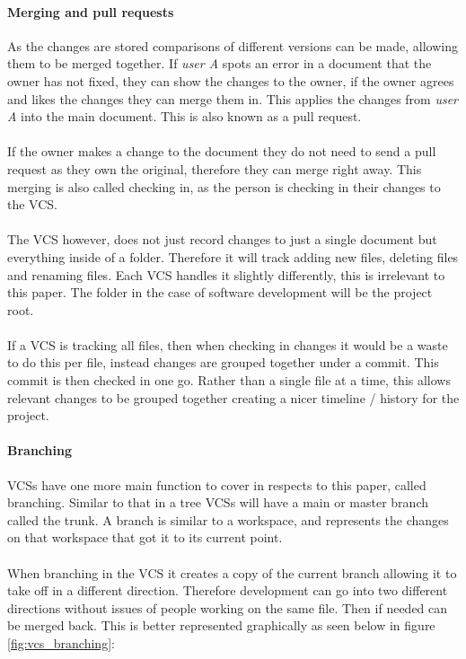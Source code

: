 \paragraph{Merging and pull requests}
As the changes are stored comparisons of different versions can be made, allowing them to be merged together. If \textit{user A} spots an error in a document that the owner has not fixed, they can show the changes to the owner, if the owner agrees and likes the changes they can merge them in. This applies the changes from \textit{user A} into the main document. This is also known as a pull request.
\\\\
If the owner makes a change to the document they do not need to send a pull request as they own the original, therefore they can merge right away. This merging is also called checking in, as the person is checking in their changes to the VCS.
\\\\
The VCS however, does not just record changes to just a single document but everything inside of a folder. Therefore it will track adding new files, deleting files and renaming files. Each VCS handles it slightly differently, this is irrelevant to this paper. The folder in the case of software development will be the project root.
\\\\
If a VCS is tracking all files, then when checking in changes it would be a waste to do this per file, instead changes are grouped together under a commit. This commit is then checked in one go. Rather than a single file at a time, this allows relevant changes to be grouped together creating a nicer timeline / history for the project.

\paragraph{Branching}
VCSs have one more main function to cover in respects to this paper, called branching. Similar to that in a tree VCSs will have a main or master branch called the trunk. A branch is similar to a workspace, and represents the changes on that workspace that got it to its current point.
\\\\
When branching in the VCS it creates a copy of the current branch allowing it to take off in a different direction. Therefore development can go into two different directions without issues of people working on the same file. Then if needed can be merged back. This is better represented graphically as seen below in figure \ref{fig:vcs_branching}:

